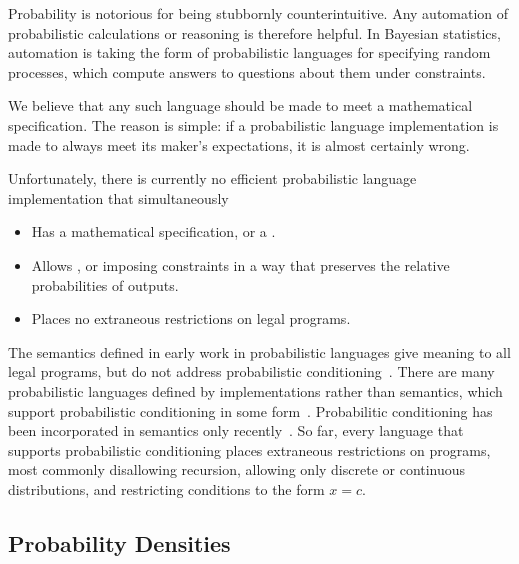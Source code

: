 \documentclass{llncs}
\begin{document}
Probability is notorious for being stubbornly counterintuitive.
Any automation of probabilistic calculations or reasoning is therefore helpful.
In Bayesian statistics, automation is taking the form of probabilistic languages for specifying random processes, which compute answers to questions about them under constraints.

We believe that any such language should be made to meet a mathematical specification.
The reason is simple: if a probabilistic language implementation is made to always meet its maker's expectations, it is almost certainly wrong.

Unfortunately, there is currently no efficient probabilistic language implementation that simultaneously
\begin{itemize}
	\item Has a mathematical specification, or a .
	\item Allows , or imposing constraints in a way that preserves the relative probabilities of outputs.
	\item Places no extraneous restrictions on legal programs.
\end{itemize}
The semantics defined in early work in probabilistic languages give meaning to all legal programs, but do not address probabilistic conditioning~\cite{cit:kozen-1979fcs-prob-programs-short,cit:hurd-2002thesis,cit:jones-1990thesis,cit:ramsey-2002popl-stochastic-short}.
There are many probabilistic languages defined by implementations rather than semantics, which support probabilistic conditioning in some form~\cite{cit:koller-1997aaai-bayes-programs-short,cit:winbugs-language-short,cit:blog-language-short,cit:blaise-language,cit:church-language-short,cit:kiselyov-2008uai-monolingual,cit:wingate-2011ais-lightweight,cit:wingate-2011nips-nonstandard}.
Probabilitic conditioning has been incorporated in semantics only recently~\cite{cit:toronto-2010ifl-bayes,cit:pfeffer-2007chapter-ibal,cit:borgstrom-2011esop-measure-transformer,cit:bhat-2013etaps-densities}.
So far, every language that supports probabilistic conditioning places extraneous restrictions on programs, most commonly disallowing recursion, allowing only discrete or continuous distributions, and restricting conditions to the form $\mathit{x} = \mathit{c}$.

\subsection{Probability Densities}
\end{document}
